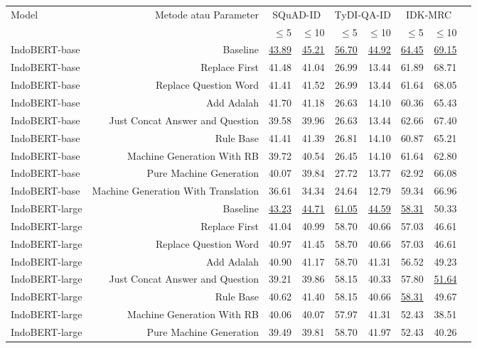 \begin{table}[H]\centering
\scriptsize
\begin{tabular}{lrrrrrrrr}\toprule
\multirow{2}{*}{Model} &\multirow{2}{*}{Metode atau Parameter} &\multicolumn{2}{c}{SQuAD-ID} &\multicolumn{2}{c}{TyDI-QA-ID} &\multicolumn{2}{c}{IDK-MRC} \\\cmidrule{3-8}
& &$\leq$5 &$\leq$10 &$\leq$5 &$\leq$10 &$\leq$5 &$\leq$10 \\\midrule
IndoBERT-base &Baseline &\underline{43.89} &\underline{45.21} &\underline{56.70} &\underline{44.92} &\underline{64.45} &\underline{69.15} \\
IndoBERT-base &Replace First &41.48 &41.04 &26.99 &13.44 &61.89 &68.71 \\
IndoBERT-base &Replace Question Word &41.41 &41.52 &26.99 &13.44 &61.64 &68.05 \\
IndoBERT-base &Add Adalah &41.70 &41.18 &26.63 &14.10 &60.36 &65.43 \\
IndoBERT-base &Just Concat Answer and Question &39.58 &39.96 &26.63 &13.44 &62.66 &67.40 \\
IndoBERT-base &Rule Base &41.41 &41.39 &26.81 &14.10 &60.87 &65.21 \\
IndoBERT-base &Machine Generation With RB &39.72 &40.54 &26.45 &14.10 &61.64 &62.80 \\
IndoBERT-base &Pure Machine Generation &40.07 &39.84 &27.72 &13.77 &62.92 &66.08 \\
IndoBERT-base &Machine Generation With Translation &36.61 &34.34 &24.64 &12.79 &59.34 &66.96 \\
\hline
IndoBERT-large &Baseline &\underline{43.23} &\underline{44.71} &\underline{61.05} &\underline{44.59} &\underline{58.31} &50.33 \\
IndoBERT-large &Replace First &41.04 &40.99 &58.70 &40.66 &57.03 &46.61 \\
IndoBERT-large &Replace Question Word &40.97 &41.45 &58.70 &40.66 &57.03 &46.61 \\
IndoBERT-large &Add Adalah &40.90 &41.17 &58.70 &41.31 &56.52 &49.23 \\
IndoBERT-large &Just Concat Answer and Question &39.21 &39.86 &58.15 &40.33 &57.80 &\underline{51.64} \\
IndoBERT-large &Rule Base &40.62 &41.40 &58.15 &40.66 &\underline{58.31} &49.67 \\
IndoBERT-large &Machine Generation With RB &40.06 &40.07 &57.97 &41.31 &52.43 &38.51 \\
IndoBERT-large &Pure Machine Generation &39.49 &39.81 &58.70 &41.97 &52.43 &40.26 \\

\end{tabular}
\end{table}
